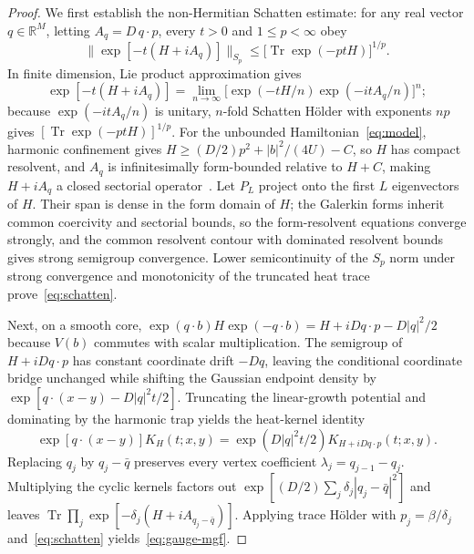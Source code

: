 \documentclass[11pt]{article}
\theoremstyle{remark}
\DeclareMathOperator{\Tr}{Tr}
\begin{document}
\begin{proof}
We first establish the non-Hermitian Schatten estimate: for any real vector $q\in\mathbb R^M$, letting $A_q=D\,q\cdot p$, every $t>0$ and $1\le p<\infty$ obey
\begin{equation}\label{eq:schatten}
 \|\exp[-t(H+iA_q)]\|_{S_p} \le \bigl[\Tr\exp(-ptH)\bigr]^{1/p}.
\end{equation}
In finite dimension, Lie product approximation gives
\[
 \exp[-t(H+iA_q)]=\lim_{n\to\infty}\bigl[\exp(-tH/n)\exp(-itA_q/n)\bigr]^n;
\]
because $\exp(-itA_q/n)$ is unitary, $n$-fold Schatten H\"older with exponents $np$ gives $[\Tr\exp(-ptH)]^{1/p}$. For the unbounded Hamiltonian~\eqref{eq:model}, harmonic confinement gives $H\ge (D/2)p^2+|b|^2/(4U)-C$, so $H$ has compact resolvent, and $A_q$ is infinitesimally form-bounded relative to $H+C$, making $H+iA_q$ a closed sectorial operator~\cite{kato}. Let $P_L$ project onto the first $L$ eigenvectors of $H$. Their span is dense in the form domain of $H$; the Galerkin forms inherit common coercivity and sectorial bounds, so the form-resolvent equations converge strongly, and the common resolvent contour with dominated resolvent bounds gives strong semigroup convergence. Lower semicontinuity of the $S_p$ norm under strong convergence and monotonicity of the truncated heat trace prove~\eqref{eq:schatten}.

Next, on a smooth core, $\exp(q\cdot b)H\exp(-q\cdot b)=H+iDq\cdot p-D|q|^2/2$ because $V(b)$ commutes with scalar multiplication. The semigroup of $H+iDq\cdot p$ has constant coordinate drift $-Dq$, leaving the conditional coordinate bridge unchanged while shifting the Gaussian endpoint density by $\exp[q\cdot(x-y)-D|q|^2t/2]$. Truncating the linear-growth potential and dominating by the harmonic trap yields the heat-kernel identity
\[
 \exp[q\cdot(x-y)]K_H(t;x,y)=\exp(D|q|^2t/2)K_{H+iDq\cdot p}(t;x,y).
\]
Replacing $q_j$ by $q_j-\bar q$ preserves every vertex coefficient $\lambda_j=q_{j-1}-q_j$. Multiplying the cyclic kernels factors out $\exp[(D/2)\sum_j\delta_j|q_j-\bar q|^2]$ and leaves $\Tr\prod_j \exp[-\delta_j(H+iA_{q_j-\bar q})]$. Applying trace H\"older with $p_j=\beta/\delta_j$ and~\eqref{eq:schatten} yields~\eqref{eq:gauge-mgf}.


\end{proof}
\end{document}
